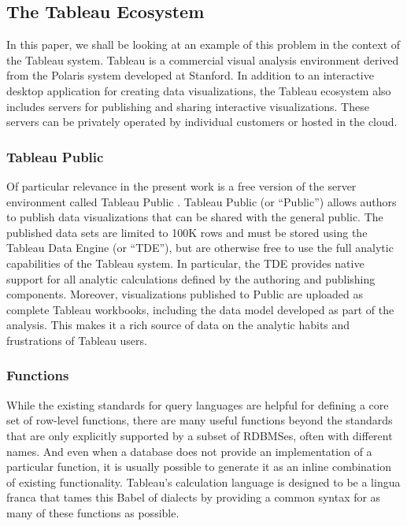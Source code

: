\subsection{The Tableau Ecosystem}
In this paper, we shall be looking at an example of this problem in the context of the Tableau system. Tableau is a commercial visual analysis environment derived from the Polaris \cite{Stolte:2008} system developed at Stanford. In addition to an interactive desktop application for creating data visualizations, the Tableau ecosystem also includes servers for publishing and sharing interactive visualizations. These servers can be privately operated by individual customers or hosted in the cloud. 

\subsubsection{Tableau Public}
Of particular relevance in the present work is a free version of the server environment called Tableau Public \cite{Public}. Tableau Public (or ``Public'') allows authors to publish data visualizations that can be shared with the general public. The published data sets are limited to 100K rows and must be stored using the Tableau Data Engine (or ``TDE'')\cite{TDE1,TDE2}, but are otherwise free to use the full analytic capabilities of the Tableau system. In particular, the TDE provides native support for all analytic calculations defined by the authoring and publishing components. Moreover, visualizations published to Public are uploaded as complete Tableau workbooks, including the data model developed as part of the analysis. This makes it a rich source of data on the analytic habits and frustrations of Tableau users.

\subsubsection{Functions}
While the existing standards for query languages are helpful for defining a core set of row-level functions, there are many useful functions beyond the standards that are only explicitly supported by a subset of RDBMSes, often with different names. And even when a database does not provide an implementation of a particular function, it is usually possible to generate it as an inline combination of existing functionality. Tableau's calculation language is designed to be a lingua franca that tames this Babel of dialects by providing a common syntax for as many of these functions as possible.

